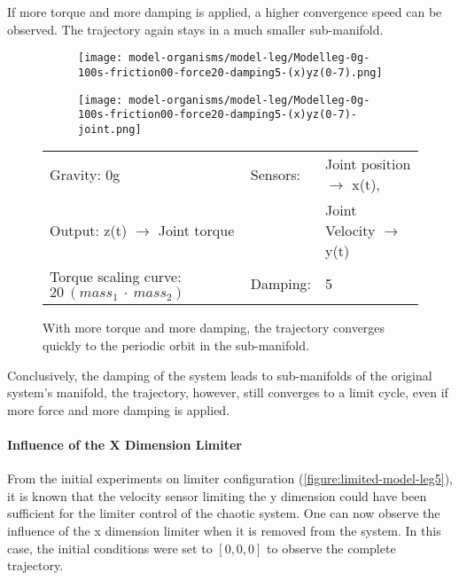 \documentclass[main]{subfiles}
\begin{document}
If more torque and more damping is applied, a higher convergence speed can be observed. The trajectory again stays in a much smaller sub-manifold.

\begin{figure}[H]
	\centering
		\begin{subfigure}[c]{0.45\textwidth}
	\texttt{[image: model-organisms/model-leg/Modelleg-0g-100s-friction00-force20-damping5-(x)yz(0-7).png]}
		\end{subfigure}
	\begin{subfigure}[c]{0.45\textwidth}
	\texttt{[image: model-organisms/model-leg/Modelleg-0g-100s-friction00-force20-damping5-(x)yz(0-7)-joint.png]}
		\end{subfigure}
	\caption[Highly damped, torque strongly increased, limited chaotic controller controlling model leg]{With more torque and more damping, the trajectory converges quickly to the periodic orbit in the sub-manifold.}
	\begin{tabular}{l|ll}
	\hline 
	Gravity: 0g  & Sensors: & Joint position \(\rightarrow\) x(t),\\
	 Output: z(t) \(\rightarrow\) Joint torque &  & Joint Velocity \(\rightarrow\) y(t) \\
	  Torque scaling curve: \(20~(mass_1~\cdot~mass_2)\) & Damping: & 5 \\
	  \hline
	\end{tabular}

	\label{figure:limited-damped-model-leg-damping4}
\end{figure}

Conclusively, the damping of the system leads to sub-manifolds of the original system's manifold, the trajectory, however, still converges to a limit cycle, even if more force and more damping is applied.

\paragraph{Influence of the X Dimension Limiter} From the initial experiments on limiter configuration (\ref{figure:limited-model-leg5}), it is known that the velocity sensor limiting the y dimension could have been sufficient for the limiter control of the chaotic system. %
%
One can now observe the influence of the x dimension limiter when it is removed from the system. In this case, the initial conditions were set to \([0,0,0]\) to observe the complete trajectory.
\end{document}

